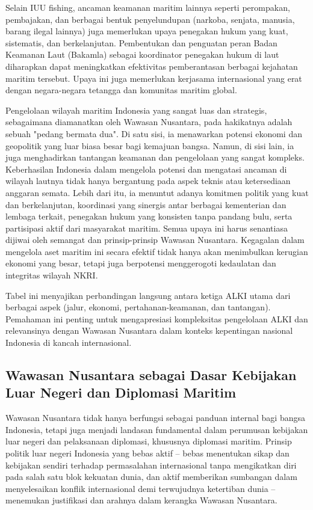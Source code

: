 \documentclass[12pt, a4paper]{article}
\begin{document}
Selain IUU fishing, ancaman keamanan maritim lainnya seperti perompakan, pembajakan, dan berbagai bentuk penyelundupan (narkoba, senjata, manusia, barang ilegal lainnya) juga memerlukan upaya penegakan hukum yang kuat, sistematis, dan berkelanjutan. Pembentukan dan penguatan peran Badan Keamanan Laut (Bakamla) sebagai koordinator penegakan hukum di laut diharapkan dapat meningkatkan efektivitas pemberantasan berbagai kejahatan maritim tersebut. Upaya ini juga memerlukan kerjasama internasional yang erat dengan negara-negara tetangga dan komunitas maritim global.  

Pengelolaan wilayah maritim Indonesia yang sangat luas dan strategis, sebagaimana diamanatkan oleh Wawasan Nusantara, pada hakikatnya adalah sebuah "pedang bermata dua". Di satu sisi, ia menawarkan potensi ekonomi dan geopolitik yang luar biasa besar bagi kemajuan bangsa. Namun, di sisi lain, ia juga menghadirkan tantangan keamanan dan pengelolaan yang sangat kompleks. Keberhasilan Indonesia dalam mengelola potensi dan mengatasi ancaman di wilayah lautnya tidak hanya bergantung pada aspek teknis atau ketersediaan anggaran semata. Lebih dari itu, ia menuntut adanya komitmen politik yang kuat dan berkelanjutan, koordinasi yang sinergis antar berbagai kementerian dan lembaga terkait, penegakan hukum yang konsisten tanpa pandang bulu, serta partisipasi aktif dari masyarakat maritim. Semua upaya ini harus senantiasa dijiwai oleh semangat dan prinsip-prinsip Wawasan Nusantara. Kegagalan dalam mengelola aset maritim ini secara efektif tidak hanya akan menimbulkan kerugian ekonomi yang besar, tetapi juga berpotensi menggerogoti kedaulatan dan integritas wilayah NKRI.

Tabel ini menyajikan perbandingan langsung antara ketiga ALKI utama dari berbagai aspek (jalur, ekonomi, pertahanan-keamanan, dan tantangan). Pemahaman ini penting untuk mengapresiasi kompleksitas pengelolaan ALKI dan relevansinya dengan Wawasan Nusantara dalam konteks kepentingan nasional Indonesia di kancah internasional.
\subsection*{Wawasan Nusantara sebagai Dasar Kebijakan Luar Negeri dan Diplomasi Maritim}

Wawasan Nusantara tidak hanya berfungsi sebagai panduan internal bagi bangsa Indonesia, tetapi juga menjadi landasan fundamental dalam perumusan kebijakan luar negeri dan pelaksanaan diplomasi, khususnya diplomasi maritim. Prinsip politik luar negeri Indonesia yang bebas aktif – bebas menentukan sikap dan kebijakan sendiri terhadap permasalahan internasional tanpa mengikatkan diri pada salah satu blok kekuatan dunia, dan aktif memberikan sumbangan dalam menyelesaikan konflik internasional demi terwujudnya ketertiban dunia – menemukan justifikasi dan arahnya dalam kerangka Wawasan Nusantara.  
\end{document}
